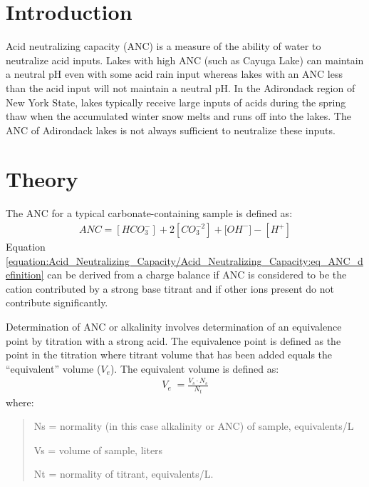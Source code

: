 \documentclass[letterpaper,10pt,english]{sphinxmanual}
\begin{document}
\section{Introduction}
\label{\detokenize{Acid_Neutralizing_Capacity/Acid_Neutralizing_Capacity:introduction}}\label{\detokenize{Acid_Neutralizing_Capacity/Acid_Neutralizing_Capacity:heading-anc-introduction}}
Acid neutralizing capacity (ANC) is a measure of the ability of water to neutralize acid inputs. Lakes with high ANC (such as Cayuga Lake) can maintain a neutral pH even with some acid rain input whereas lakes with an ANC less than the acid input will not maintain a neutral pH. In the Adirondack region of New York State, lakes typically receive large inputs of acids during the spring thaw when the accumulated winter snow melts and runs off into the lakes. The ANC of Adirondack lakes is not always sufficient to neutralize these inputs.


\section{Theory}
\label{\detokenize{Acid_Neutralizing_Capacity/Acid_Neutralizing_Capacity:theory}}\label{\detokenize{Acid_Neutralizing_Capacity/Acid_Neutralizing_Capacity:heading-anc-theory}}
The ANC for a typical carbonate-containing sample is defined as:
\begin{equation}\label{equation:Acid_Neutralizing_Capacity/Acid_Neutralizing_Capacity:eq_ANC_definition}
\begin{split} ANC = [HCO_3^-]+2[CO_3^{-2} ]+{[OH}^- ] - [H^+]\end{split}
\end{equation}
Equation \eqref{equation:Acid_Neutralizing_Capacity/Acid_Neutralizing_Capacity:eq_ANC_definition} can be derived from a charge balance if ANC is considered to be the cation contributed by a strong base titrant and if other ions present do not contribute significantly.

Determination of ANC or alkalinity involves determination of an equivalence point by titration with a strong acid. The equivalence point is defined as the point in the titration where titrant volume that has been added equals the “equivalent” volume (\(V_e\)). The equivalent volume is defined as:
\begin{equation}\label{equation:Acid_Neutralizing_Capacity/Acid_Neutralizing_Capacity:Acid_Neutralizing_Capacity/Acid_Neutralizing_Capacity:0}
\begin{split}V_{e} {\; =}\frac{V_{s} \cdot N_{s} }{N_{t} }\end{split}
\end{equation}
where:
\begin{quote}

\begin{DUlineblock}{0em}
\item[] Ns = normality (in this case alkalinity or ANC) of sample, equivalents/L
\item[] Vs = volume of sample, liters
\item[] Nt = normality of titrant, equivalents/L.
\end{DUlineblock}
\end{quote}
\end{document}
